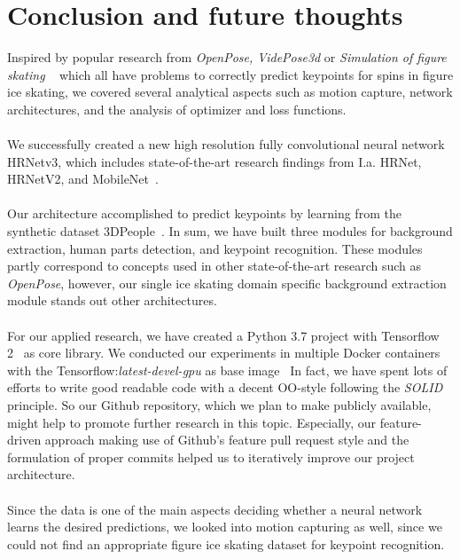 \chapter{Conclusion and future thoughts}
\label{conclusion}
Inspired by popular research from \textit{OpenPose, VidePose3d} or \textit{Simulation of figure skating} ~\cite{openpose, videopose3d, figureskatingsimulation}
which all have problems to correctly predict keypoints for spins in figure ice skating, we covered several
analytical aspects such as motion capture, network architectures, and the analysis of optimizer and loss functions.
\\\mbox{}\\
We successfully created a new high resolution fully convolutional neural network HRNetv3, which includes state-of-the-art
research findings from I.a. HRNet, HRNetV2, and MobileNet~\cite{HRNetv1, HRNetv2, mobilenet}.
\\\mbox{}\\
Our architecture accomplished to predict keypoints by learning from the synthetic dataset 3DPeople~\cite{3dpeople}.
In sum, we have built three modules for background extraction, human parts detection, and keypoint recognition.
These modules partly correspond to concepts used in other state-of-the-art research such as \textit{OpenPose}, however, our
single ice skating domain specific background extraction module stands out other architectures.
\\\mbox{}\\
For our applied research, we have created a Python 3.7 project with Tensorflow 2~\cite{tensorflow2} as core library.
We conducted our experiments in multiple Docker containers with the Tensorflow:\textit{latest-devel-gpu} as base
image~\cite{tensorflowdocker}
In fact, we have spent lots of efforts to write good readable code with a decent OO-style following the \textit{SOLID} principle.
So our Github repository, which we plan to make publicly available, might help to promote further research in this topic.
Especially, our feature-driven approach making use of Github's feature pull request style and the formulation of proper
commits helped us to iteratively improve our project architecture.
\\\mbox{}\\
Since the data is one of the main aspects deciding whether a neural network learns the desired predictions, we looked into
motion capturing as well, since we could not find an appropriate figure ice skating dataset for keypoint recognition.
